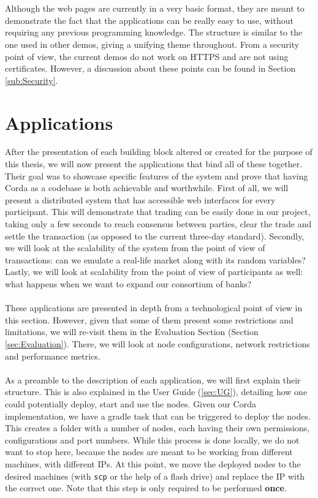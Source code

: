 \documentclass[12pt,twoside]{article}
\begin{document}
\\ \\
Although the web pages are currently in a very basic format, they are meant to demonstrate the fact that the applications can be really easy to use, without requiring any previous programming knowledge. The structure is similar to the one used in other demos, giving a unifying theme throughout. From a security point of view, the current demos do not work on HTTPS and are not using certificates. However, a discussion about these points can be found in Section \ref{sub:Security}.
\newpage
\section{Applications}
\label{sub:apps}
After the presentation of each building block altered or created for the purpose of this thesis, we will now present the applications that bind all of these together. Their goal was to showcase specific features of the system and prove that having Corda as a codebase is both achievable and worthwhile. First of all, we will present a distributed system that has accessible web interfaces for every participant. This will demonstrate that trading can be easily done in our project, taking only a few seconds to reach consensus between parties, clear the trade and settle the transaction (as opposed to the current three-day standard). Secondly, we will look at the scalability of the system from the point of view of transactions: can we emulate a real-life market along with its random variables? Lastly, we will look at scalability from the point of view of participants as well: what happens when we want to expand our consortium of banks? 
\\ \\
These applications are presented in depth from a technological point of view in this section. However, given that some of them present some restrictions and limitations, we will re-visit them in the Evaluation Section (Section \ref{sec:Evaluation}). There, we will look at node configurations, network restrictions and performance metrics.
\\ \\
As a preamble to the description of each application, we will first explain their structure. This is also explained in the User Guide (\ref{sec:UG}), detailing how one could potentially deploy, start and use the nodes. Given our Corda implementation, we have a gradle task that can be triggered to deploy the nodes. This creates a folder with a number of nodes, each having their own permissions, configurations and port numbers. While this process is done locally, we do not want to stop here, because the nodes are meant to be working from different machines, with different IPs. At this point, we move the deployed nodes to the desired machines (with \verb|scp| or the help of a flash drive) and replace the IP with the correct one. Note that this step is only required to be performed \textbf{once}.
\end{document}
